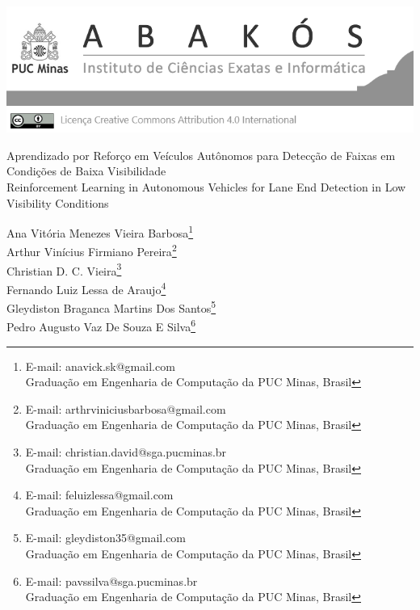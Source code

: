\documentclass[a4paper,12pt,Times]{article}
\makeatletter
\newcommand{\monog}{Aprendizado por Reforço em Veículos Autônomos para Detecção de Faixas em Condições de Baixa Visibilidade}
\newcommand{\monogES}{Reinforcement Learning in Autonomous Vehicles for Lane End Detection in Low Visibility Conditions}
\newcommand{\origem}{Brasil}
\newcommand{\AutorA}{Ana Vitória Menezes Vieira Barbosa}
\newcommand{\funcaoA}{}
\newcommand{\emailA}{anavick.sk@gmail.com}
\newcommand{\cursA}{Graduação em Engenharia de Computação da PUC Minas}
\newcommand{\AutorB}{Arthur Vinícius Firmiano Pereira}
\newcommand{\funcaoB}{}
\newcommand{\emailB}{arthrviniciusbarbosa@gmail.com}
\newcommand{\cursB}{Graduação em Engenharia de Computação da PUC Minas}
\newcommand{\AutorC}{Christian D. C. Vieira}
\newcommand{\funcaoC}{}
\newcommand{\emailC}{christian.david@sga.pucminas.br}
\newcommand{\cursC}{Graduação em Engenharia de Computação da PUC Minas}
\newcommand{\AutorD}{Fernando Luiz Lessa de Araujo}
\newcommand{\funcaoD}{}
\newcommand{\emailD}{feluizlessa@gmail.com}
\newcommand{\cursD}{Graduação em Engenharia de Computação da PUC Minas}
\newcommand{\AutorE}{Gleydiston Braganca Martins Dos Santos}
\newcommand{\funcaoE}{}
\newcommand{\emailE}{gleydiston35@gmail.com}
\newcommand{\cursE}{Graduação em Engenharia de Computação da PUC Minas}
\newcommand{\AutorF}{Pedro Augusto Vaz De Souza E Silva}
\newcommand{\funcaoF}{}
\newcommand{\emailF}{pavssilva@sga.pucminas.br}
\newcommand{\cursF}{Graduação em Engenharia de Computação da PUC Minas}
\makeatother
\begin{document}

\begin{flushleft}

\begin{minipage}[c][5cm][b]{\textwidth}
  \centering
  \includegraphics[width=\linewidth]{figuras/pucmg.png} 
\end{minipage}

 \vspace{0cm} {
 \singlespacing \Large{\monog {} \\ }
  \normalsize{\monogES}
 }
\end{flushleft}
\begin{flushright}
\singlespacing

\footnotesize{\AutorA \footnote{\funcaoA E-mail: \emailA \\ \cursA, \origem}} \\
\footnotesize{\AutorB \footnote{\funcaoB E-mail: \emailB \\ \cursB, \origem}} \\
\footnotesize{\AutorC \footnote{\funcaoC E-mail: \emailC \\ \cursC, \origem}} \\
\footnotesize{\AutorD \footnote{\funcaoD E-mail: \emailD \\ \cursD, \origem}} \\
\footnotesize{\AutorE \footnote{\funcaoE E-mail: \emailE \\ \cursE, \origem}} \\
\footnotesize{\AutorF \footnote{\funcaoF E-mail: \emailF \\ \cursF, \origem}} \\
\end{flushright}
\thispagestyle{empty}
\end{document}
